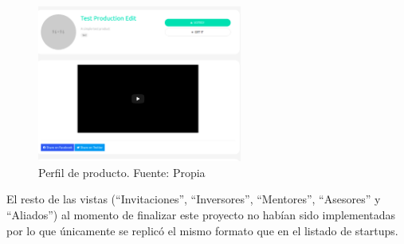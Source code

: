 \begin{figure}[H]
\centering
\includegraphics[width=0.60\textwidth]{img/55.png}
\caption{Perfil de producto. Fuente: Propia}
\label{figure:productProfileShow}
\end{figure}

El resto de las vistas (“Invitaciones”, “Inversores”, “Mentores”, “Asesores” y “Aliados”) al momento de finalizar este proyecto no habían sido implementadas por lo que únicamente se replicó el mismo formato que en el listado de startups.

